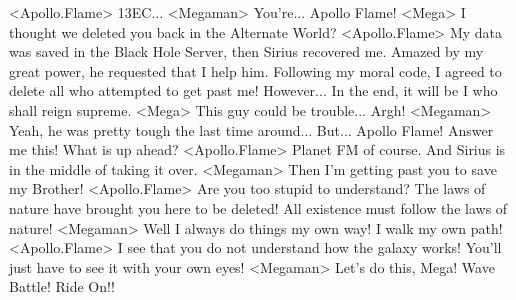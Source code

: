 <Apollo.Flame> {13}{EC}... 
<Megaman> You're... Apollo Flame! 
<Mega> I thought we deleted you back in the Alternate World? 
<Apollo.Flame> My data was saved in the Black Hole Server, then Sirius recovered me. 
Amazed by my great power, he requested that I help him. 
Following my moral code, I agreed to delete all who attempted to get past me! 
However... In the end, it will be I who shall reign supreme. 
<Mega> This guy could be trouble... Argh! 
<Megaman> Yeah, he was pretty tough the last time around... 
But... 
Apollo Flame! Answer me this! 
What is up ahead? 
<Apollo.Flame> Planet FM of course. And Sirius is in the middle of taking it over. 
<Megaman> Then I'm getting past you to save my Brother! 
<Apollo.Flame> Are you too stupid to understand? 
The laws of nature have brought you here to be deleted! 
All existence must follow the laws of nature! 
<Megaman> Well I always do things my own way! I walk my own path! 
<Apollo.Flame> I see that you do not understand how the galaxy works! 
You'll just have to see it with your own eyes! 
<Megaman> Let's do this, Mega! 
Wave Battle! Ride On!! 
